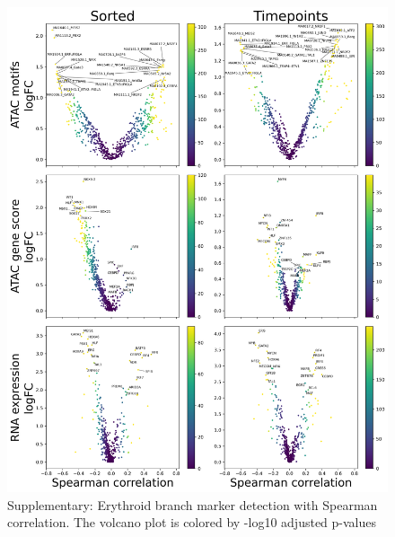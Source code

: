 \documentclass[a4paper]{article}
\begin{document}
\begin{figure}[!htb]
  \centering
  \includegraphics[width=\textwidth]{../figures/hematopoiesis/Myeloid DC_40_107_smooth_none_single_branch_volcanos_motifs.png}
  \caption{Supplementary: Erythroid branch marker detection with Spearman correlation. The volcano plot is colored by -log10 adjusted p-values}
\end{figure}
\end{document}
